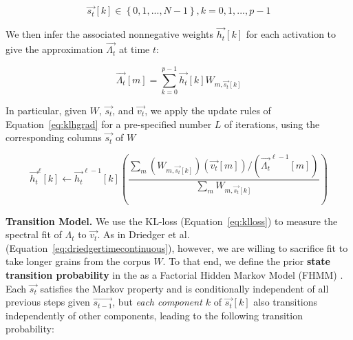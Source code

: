 \documentclass{article}
\begin{document}
    \begin{equation} 
        \label{eq:statevector}
        \vec{s_t}[k] \in \left\{0, 1, ..., N-1\right\}, k = 0, 1, ..., p-1 
    \end{equation}

    We then infer the associated nonnegative weights $\vec{h_t}[k]$ for each activation to give the approximation $\vec{\Lambda_t}$ at time $t$:
    
    \begin{equation}
        \label{eq:approximation}
        \vec{\Lambda_t}[m] = \sum_{k=0}^{p-1} \vec{h_t}[k]  W_{m, \vec{s_t}[k]}
    \end{equation}

    In particular, given $W$, $\vec{s_t}$, and $\vec{v_t}$, we apply the update rules of Equation~\ref{eq:klhgrad} for a pre-specified number $L$ of iterations, using the corresponding columns $\vec{s_t}$ of $W$

    \begin{equation}
        \label{eq:sparseklhgrad}
        \vec{h_t}^{\ell}[k]  \gets \vec{h_t}^{\ell-1}[k] \left(  \frac{\sum_m (W_{m, \vec{s_t}[k]}) (\vec{v_t}[m]) / (\vec{\Lambda_t}^{\ell-1}[m]) }{ \sum_{m} W_{m, \vec{s_t}[k]}} \right)
    \end{equation}
    

    \textbf{Transition Model.} We use the KL-loss (Equation~\ref{eq:klloss}) to measure the spectral fit of $\Lambda_t$ to $\vec{v_t}$.  As in Driedger et al. \cite{driedger2015let} (Equation~\ref{eq:driedgertimecontinuous}), however, we are willing to sacrifice fit to take longer grains from the corpus $W$.  To that end, we define the prior  \textbf{state transition probability} in the as a Factorial Hidden Markov Model (FHMM) \cite{ghahramani1995factorial}. Each $\vec{s_t}$ satisfies the Markov property and is conditionally independent of all previous steps given $\vec{s_{t-1}}$, but {\em each component $k$} of $\vec{s_t}[k]$ also transitions independently of other components, leading to the following transition probability:
\end{document}

